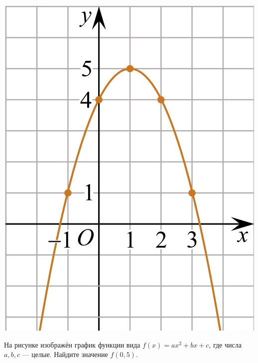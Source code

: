 \begin{class}[number=4]
\begin{listofex}
\begin{minipage}[c]{0.25\textwidth}
			\includegraphics[align=t, width=\textwidth]{pics/G101M4C4-3.jpg}
		\end{minipage}
		\item
		\begin{minipage}[t]{0.67\textwidth}
			На рисунке изображён график функции вида \(f(x)=ax^2+bx+c\), где числа \(a, b, c\) --- целые. Найдите значение \(f(0,5)\).
		\end{minipage}
		\begin{minipage}[c]{0.25\textwidth}

\end{minipage}
\end{listofex}
\end{class}
